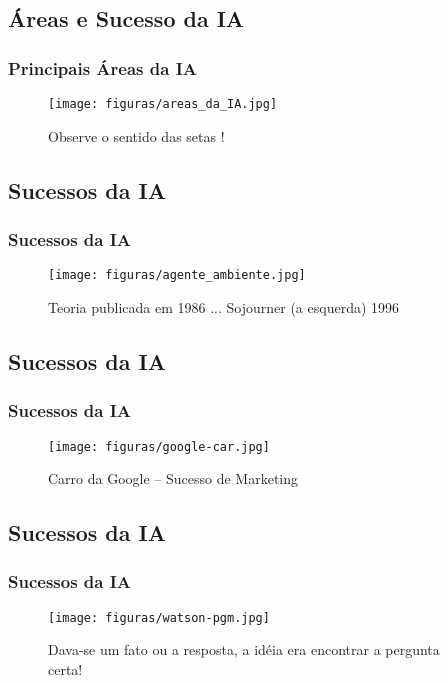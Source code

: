 \documentclass{beamer}
\begin{document}
\subsection{Áreas e Sucesso da IA}
\begin{frame}
\frametitle{Principais Áreas da IA}

\begin{figure}[ht!]
 \centering
 \texttt{[image: figuras/areas\_da\_IA.jpg]}

\caption{Observe o sentido das setas !}

\end{figure}



\end{frame}


\subsection{Sucessos da IA}
\begin{frame}
\frametitle{Sucessos da IA}

\begin{figure}[ht!]
 \centering
 \texttt{[image: figuras/agente\_ambiente.jpg]}
 \caption{Teoria publicada em 1986 ... Sojourner (a esquerda) 1996}
 \end{figure}
\end{frame}

\subsection{Sucessos da IA}
\begin{frame}
\frametitle{Sucessos da IA}

\begin{figure}[ht!]
 \centering
 \texttt{[image: figuras/google-car.jpg]}
\caption{Carro da Google -- Sucesso de Marketing}

\end{figure}

\end{frame}
\subsection{Sucessos da IA}
\begin{frame}
\frametitle{Sucessos da IA}

\begin{figure}[ht!]
 \centering
 \texttt{[image: figuras/watson-pgm.jpg]}
\caption{Dava-se um fato ou a resposta, a idéia era encontrar a pergunta certa!}

\end{figure}

\end{frame}
\end{document}

